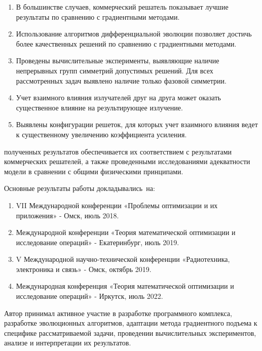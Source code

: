 {}
\begin{enumerate}[beginpenalty=10000] %
  \item В большинстве случаев, коммерческий решатель показывает лучшие результаты по сравнению с градиентными методами.
  \item Использование алгоритмов дифференциальной эволюции позволяет достичь более качественных решений по сравнению с градиентными методами.
  \item Проведены вычислительные эксперименты, выявляющие наличие непрерывных групп симметрий допустимых решений. Для всех рассмотренных задач выявлено наличие только фазовой симметрии.
  \item Учет взаимного влияния излучателей друг на друга может оказать существенное влияние на результирующее излучение.
  \item Выявлены конфигурации решеток, для которых учет взаимного влияния ведет к существенному увеличению коэффициента усиления.
\end{enumerate}

{\reliability} полученных результатов обеспечивается их соответствием с результатами коммерческих решателей, а также проведенными исследованиями адекватности модели в сравнении с общими физическими принципами.


{\probation}
Основные результаты работы докладывались~на:
\begin{enumerate}[beginpenalty=10000] %
  \item VII Международной конференции «Проблемы оптимизации и их приложения» - Омск, июль 2018.
  \item Международной конференции «Теория математической оптимизации и исследование операций» - Екатеринбург, июль 2019.
  \item V Международной научно-технической конференции «Радиотехника, электроника и связь» - Омск, октябрь 2019.
  \item Международная конференция «Теория математической оптимизации и исследование операций» - Иркутск, июль 2022.
\end{enumerate}

{\contribution} Автор принимал активное участие в разработке программного комплекса, разработке эволюционных алгоритмов, адаптации метода градиентного подъема к специфике рассматриваемой задачи, проведении вычислительных экспериментов, анализе и интерпретации их результатов.

